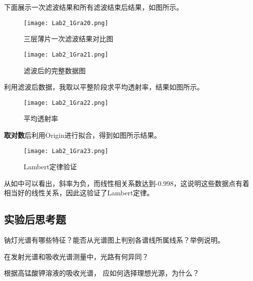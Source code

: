 \documentclass[dvipsnames, svgnames,a4paper,11pt]{article}
\begin{document}
	下面展示一次滤波结果和所有滤波结束后结果，如图所示。
	
	\begin{figure}[htbp]
		\centering
		\texttt{[image: Lab2\_1Gra20.png]}
		\caption{三层薄片一次滤波结果对比图}
		\label{fig:fig20}
	\end{figure}
	
	\begin{figure}[htbp]
		\centering
		\texttt{[image: Lab2\_1Gra21.png]}
		\caption{滤波后的完整数据图}
		\label{fig:fig21}
	\end{figure}
	
	利用滤波后数据，我取以平整阶段求平均透射率，结果如图所示。
	
	\begin{figure}[htbp]
		\centering
		\texttt{[image: Lab2\_1Gra22.png]}
		\caption{平均透射率}
		\label{fig:fig22}
	\end{figure}
	
	\textbf{取对数}后利用Origin进行拟合，得到如图所示结果。
	
	\begin{figure}[htbp]
		\centering
		\texttt{[image: Lab2\_1Gra23.png]}
		\caption{Lambert定律验证}
		\label{fig:fig23}
	\end{figure}
	
	从如中可以看出，斜率为负，而线性相关系数达到-0.998，这说明这些数据点有着相当好的线性关系，因此这验证了Lambert定律。
	
	
	\subsection{实验后思考题}
	
	\begin{question}
		钠灯光谱有哪些特征？能否从光谱图上判别各谱线所属线系？举例说明。
	\end{question}
	
	\begin{question}
		在发射光谱和吸收光谱测量中，光路有何异同？
	\end{question}
	
	\begin{question}
		根据高锰酸钾溶液的吸收光谱， 应如何选择理想光源，为什么？
	\end{question}
	
	
	
	\clearpage
	
\end{document}
